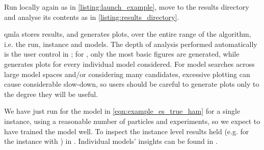 Run locally again as in \cref{listing:launch_example}, move to the results directory and analyse its contents as in \cref{listing:results_directory}. 
\par 
\gls{qmla} stores results, and generates plots, 
    over the entire range of the algorithm, i.e. the \gls{run}\footnotemark, \gls{instance} and models. 
The depth of analysis performed automatically is the user control  in ;
    for , only the most basic figures are generated, while  generates plots for every individual 
    model considered. 
For model searches across large model spaces and/or considering many candidates,
    excessive plotting can cause considerable slow-down, so users should be careful to generate plots only 
    to the degree they will be useful. 
\par 

We have just run  for the model in \cref{eqn:example_es_true_ham} for a single instance, 
    using a reasonable number of particles and experiments, so we expect to have trained the model well. 
To inspect the instance level results held (e.g. for the instance with ) in .
Individual models' insights can be found in .
\par 



